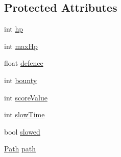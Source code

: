 \subsection*{Protected Attributes}
\begin{DoxyCompactItemize}
\item 
int \hyperlink{class_enemy_a278d70100af07c946743db1b7a1a9f59}{hp}
\item 
int \hyperlink{class_enemy_ab48bc28310a5ca396fbfaf6edc74996d}{max\+Hp}
\item 
float \hyperlink{class_enemy_a9bb5d74024760e604c41ba79cc7da892}{defence}
\item 
int \hyperlink{class_enemy_a1d9a86d110b87f3cc55b40d1bdb59eb5}{bounty}
\item 
int \hyperlink{class_enemy_abc49d5a2cef917c8ece8a16547f8efee}{score\+Value}
\item 
int \hyperlink{class_enemy_ad59184710c7f9df80138434b8487a9f5}{slow\+Time}
\item 
bool \hyperlink{class_enemy_a7f185bcecfc927871387f6bda2191d0c}{slowed}
\item 
\hyperlink{class_path}{Path} \hyperlink{class_enemy_aff8dab38e3d179a2fb471cf7a9c42cbe}{path}
\end{DoxyCompactItemize}


